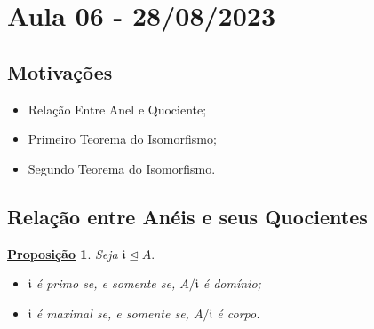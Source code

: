 \documentclass{article}
\newtheorem*{prop*}{\underline{Proposi\c c\~ao}}
\begin{document}
    \section{Aula 06 - 28/08/2023}
    \subsection{Motivações}
    \begin{itemize}
      \item Relação Entre Anel e Quociente;
      \item Primeiro Teorema do Isomorfismo;
      \item Segundo Teorema do Isomorfismo.
    \end{itemize}
    \subsection{Relação entre Anéis e seus Quocientes}
    \begin{prop*}
      Seja \(\mathfrak{i}\trianglelefteq{A}.\)
      \begin{itemize}
        \item[1)] \(\mathfrak{i}\) é primo se, e somente se, \(A/\mathfrak{i}\) é domínio;
        \item[2)] \(\mathfrak{i}\) é maximal se, e somente se, \(A/\mathfrak{i}\) é corpo.
      \end{itemize}
    \end{prop*}
\end{document}
